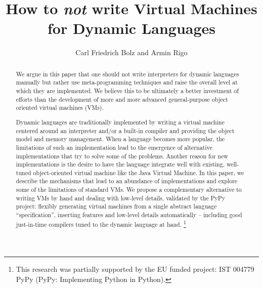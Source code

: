 \documentclass{llncs}
\begin{document}
\pagestyle{headings}

\title{How to \emph{not} write Virtual Machines for Dynamic Languages}


\author{Carl Friedrich Bolz and Armin Rigo}




\maketitle

\begin{abstract}

We argue in this paper that one should not write interpreters for dynamic
languages manually but rather use meta-programming techniques and raise the
overall level at which they are implemented. We believe this to be
ultimately a better investment of efforts than the development of more and more advanced
general-purpose object oriented virtual machines (VMs).

\medskip

Dynamic languages are traditionally implemented by writing a virtual machine
centered around an interpreter and/or a built-in compiler and providing
the object model and memory management. When a language becomes more popular,
the limitations of such an implementation lead to the emergence of alternative
implementations that try to solve some of the problems. Another reason for new
implementations is the desire to have the language integrate well with existing,
well-tuned object-oriented virtual machine like the Java Virtual Machine. In this paper, we
describe the mechanisms that lead to an abundance of implementations and
explore some of the limitations of standard VMs.  We propose a
complementary alternative to writing VMs by hand and dealing with low-level
details, validated by the PyPy project: flexibly generating virtual machines
from a single abstract language ``specification'', inserting features and
low-level details automatically -- including good just-in-time compilers tuned
to the dynamic language at hand.
\footnote{This research was partially supported by the EU funded
 project: IST 004779 PyPy (PyPy: Implementing Python in Python).} \\

\end{abstract}
\end{document}
